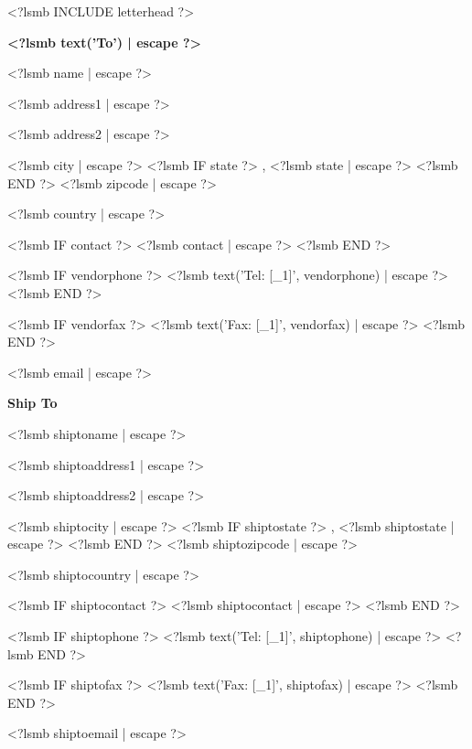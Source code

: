 \documentclass{scrartcl}
\begin{document}
\pagestyle{myheadings}
\thispagestyle{empty}

\fontsize{10pt}{12pt}\selectfont

<?lsmb INCLUDE letterhead ?>




\vspace*{0.5cm}

\parbox[t]{.5\textwidth}{
\textbf{<?lsmb text('To') | escape ?>}
\vspace{0.3cm}

<?lsmb name | escape ?>

<?lsmb address1 | escape ?>

<?lsmb address2 | escape ?>

<?lsmb city | escape ?>
<?lsmb IF state ?>
\hspace{-0.1cm}, <?lsmb state | escape ?>
<?lsmb END ?>
<?lsmb zipcode | escape ?>

<?lsmb country | escape ?>

\vspace{0.3cm}

<?lsmb IF contact ?>
<?lsmb contact | escape ?>
\vspace{0.2cm}
<?lsmb END ?>

<?lsmb IF vendorphone ?>
<?lsmb text('Tel: [_1]', vendorphone) | escape ?>
<?lsmb END ?>

<?lsmb IF vendorfax ?>
<?lsmb text('Fax: [_1]', vendorfax) | escape ?>
<?lsmb END ?>

<?lsmb email | escape ?>
}
\parbox[t]{.5\textwidth}{
\textbf{Ship To}
\vspace{0.3cm}

<?lsmb shiptoname | escape ?>

<?lsmb shiptoaddress1 | escape ?>

<?lsmb shiptoaddress2 | escape ?>

<?lsmb shiptocity | escape ?>
<?lsmb IF shiptostate ?>
\hspace{-0.1cm}, <?lsmb shiptostate | escape ?>
<?lsmb END ?>
<?lsmb shiptozipcode | escape ?>

<?lsmb shiptocountry | escape ?>

\vspace{0.3cm}

<?lsmb IF shiptocontact ?>
<?lsmb shiptocontact | escape ?>
\vspace{0.2cm}
<?lsmb END ?>

<?lsmb IF shiptophone ?>
<?lsmb text('Tel: [_1]', shiptophone) | escape ?>
<?lsmb END ?>

<?lsmb IF shiptofax ?>
<?lsmb text('Fax: [_1]', shiptofax) | escape ?>
<?lsmb END ?>

<?lsmb shiptoemail | escape ?>
}
\hfill
\end{document}
